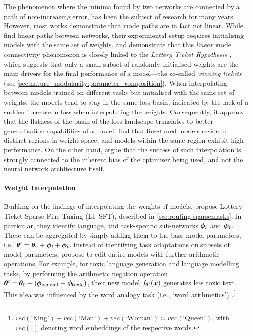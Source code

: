 \documentclass[10pt]{article} %
\begin{document}
 
 The phenomenon
where the minima found by two networks are connected
by a path of non-increasing error,  has been the subject of research for many years  \citep{Freeman2017Topology, pmlr-v80-draxler18a, Garipov2018LossSurface, Nagarajan2019UniformConvergence}. However,  most works demonstrate that mode paths are in fact not linear. While \cite{Nagarajan2019UniformConvergence} find linear paths between networks, their experimental setup requires initialising models with the same set of weights. \citet{Frankle2020LinearModeConnect} and \citet{Neyshabur2020WhatTransfered} demonstrate that this \textit{linear} mode connectivity phenomenon is closely linked to the \textit{Lottery Ticket Hypothesis} \citep{Frankle2019}, which suggests that only a small subset of randomly initialised weights are the main drivers for the final performance of a model---the so-called \textit{winning tickets} (see \cref{sec:nature_modularity:parameter_composition}). When interpolating between  models trained on different tasks but initialised with the same set of weights, the models tend to stay in the same loss basin, indicated by the lack  
of a sudden increase in loss when interpolating the weights. 
Consequently, it appears that the flatness of the basin of the loss landscape translates to better generalisation capabilities of a model. \citet{Gueta2023Knowledge}  find that fine-tuned models reside in distinct regions in weight space, and models within the same region exhibit high performance.  
On the other hand, \citet{Ainsworth2022GitReBasin} argue that the success of such interpolation is strongly connected to the inherent bias of the optimiser being used, and not the neural network architecture itself. %

\paragraph*{Weight Interpolation} 

Building on the findings of interpolating the weights of models, \cite{ansell2021composable} propose Lottery Ticket Sparse
Fine-Tuning (LT-SFT), described in \cref{sec:routing:sparsemasks}. In particular, they identify language, and task-specific sub-networks ${\bm{\phi}}_l$ and ${\bm{\phi}}_t$.  
These can be aggregated by simply adding them to the base model parameters, i.e.\ ${\bm{\theta}}^\prime = {\bm{\theta}}_0 + {\bm{\phi}}_l + {\bm{\phi}}_t$. Instead of identifying task adaptations on subsets of model parameters,
\citet{Ilharco2022EditingModelsTaskArith} propose to edit entire models with further arithmetic operations. For example, for toxic language generation and language modelling tasks, by performing the arithmetic negation operation ${\bm{\theta}}^{\prime} = {\bm{\theta}}_0 + ({\bm{\phi}}_\text{general}  - {\bm{\phi}}_\text{toxic})$, their new model $f_{{\bm{\theta}}^{\prime}}({\bm{x}})$ generates less toxic text. This idea was influenced by the word analogy task (i.e., `word arithmetics') \citep{Mikolov2013DistributedRepresentations}.\footnote{$vec(\text{`King'}) - vec(\text{`Man'}) + vec(\text{`Woman'}) \approx vec(\text{`Queen'})$, with $vec(\cdot)$ denoting word embeddings of the respective words.}
\end{document}
